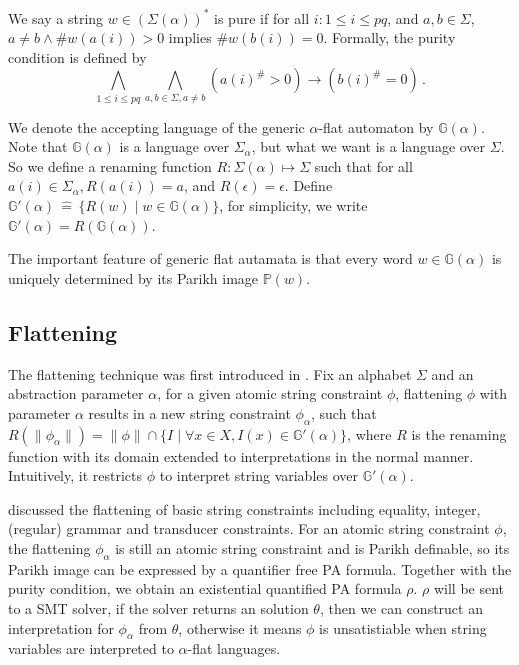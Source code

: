 \documentclass[runningheads]{llncs}
\newcommand{\Def}{\hat{=}}
\begin{document}
We say a string $w\in (\Sigma(\alpha))^*$ is pure if for all $i: 1\le i \le p q$,
and $a,b\in \Sigma$, 
$a\neq b \wedge \#w(a(i))>0$ implies $\#w(b(i))=0$.
Formally, the purity condition is defined by 
\begin{equation} \label{eq:purity}
 \bigwedge_{1\le i\le pq}\bigwedge_{a,b\in \Sigma, a\neq b} ({a(i)}^\#>0)\to ({b(i)}^\#=0)\, . 
\end{equation}

We denote the accepting language of the generic $\alpha$-flat automaton by $\mathbb{G}(\alpha)$.
Note that $\mathbb{G}(\alpha)$ is a language over $\Sigma_\alpha$,
but what we want is a language over $\Sigma$.
So we define a renaming function $R:\Sigma(\alpha)\mapsto \Sigma$ such that for all $a(i) \in \Sigma_\alpha, R(a(i))=a$,
and $R(\epsilon) = \epsilon$.
Define $\mathbb{G}'(\alpha) \, \Def \, \{R(w) \mid w\in \mathbb{G}(\alpha)\}$, 
for simplicity, we write
$\mathbb{G}'(\alpha)=R(\mathbb{G}(\alpha))$.

The important feature of generic flat autamata
is that every word $w\in \mathbb{G}(\alpha)$ is uniquely determined by its Parikh image $\mathbb{P}(w)$.


\subsection{Flattening}

The flattening technique was first introduced 
in \cite{Abdulla 2017}.
Fix an alphabet $\Sigma$ and an abstraction parameter $\alpha$, 
for a given atomic string constraint $\phi$, 
flattening $\phi$ with parameter $\alpha$ 
results in a new string constraint $\phi_\alpha$,
such that 
$R(\lVert \phi_\alpha \rVert) = \lVert \phi \rVert \cap \{I \mid \forall x\in X, I(x)\in \mathbb{G}'(\alpha)\}$,
where $R$ is the renaming function with its domain extended to interpretations in the normal manner.
Intuitively, it restricts $\phi$ to interpret 
string variables over $\mathbb{G}'(\alpha)$.

\cite{Abdulla 2017} discussed the flattening of basic 
string constraints including equality, integer, (regular) grammar and transducer constraints. 
For an atomic string constraint $\phi$,
the flattening $\phi_\alpha$ is still an atomic string constraint 
and is Parikh definable,
so its Parikh image can be expressed by a quantifier free PA formula.
Together with the purity condition,
we obtain an existential quantified PA formula $\rho$.
$\rho$ will be sent to a SMT solver,
if the solver returns an solution $\theta$,
then we can construct an interpretation for $\phi_\alpha$ from $\theta$,
otherwise it means $\phi$ is unsatistiable when 
string variables are interpreted  to $\alpha$-flat languages.
\end{document}
